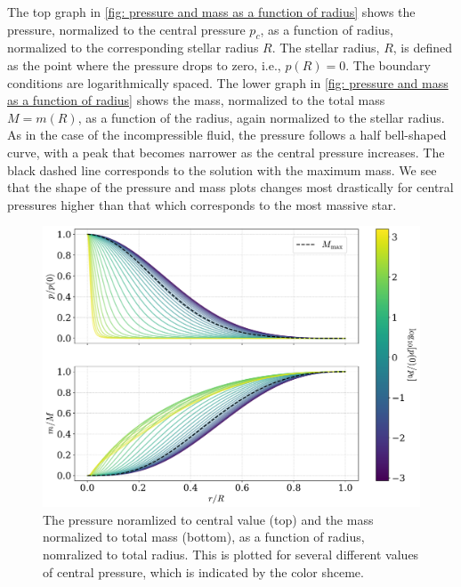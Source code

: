 The top graph in \autoref{fig: pressure and mass as a function of radius} shows the pressure, normalized to the central pressure $p_c$, as a function of radius, normalized to the corresponding stellar radius $R$.
The stellar radius, $R$, is defined as the point where the pressure drops to zero, i.e., $p(R) = 0$.
The boundary conditions are logarithmically spaced.
The lower graph in \autoref{fig: pressure and mass as a function of radius} shows the mass, normalized to the total mass $M = m(R)$, as a function of the radius, again normalized to the stellar radius.
As in the case of the incompressible fluid, the pressure follows a half bell-shaped curve, with a peak that becomes narrower as the central pressure increases.
The black dashed line corresponds to the solution with the maximum mass.
We see that the shape of the pressure and mass plots changes most drastically for central pressures higher than that which corresponds to the most massive star.

\begin{figure}[h]
    \centering
    \includegraphics[width=\textwidth]{../scripts/figurer/pressure_mass.pdf}
    \caption{The pressure noramlized to central value (top) and the mass normalized to total mass (bottom), as a function of radius, nomralized to total radius. This is plotted for several different values of central pressure, which is indicated by the color shceme.}
    \label{fig: pressure and mass as a function of radius}
\end{figure}


